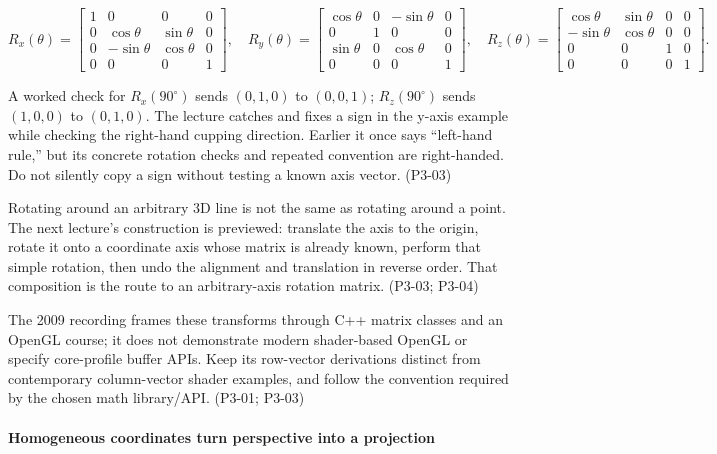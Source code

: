 \[
R_x(\theta)=\begin{bmatrix}1&0&0&0\\0&\cos\theta&\sin\theta&0\\0&-\sin\theta&\cos\theta&0\\0&0&0&1\end{bmatrix},\quad
R_y(\theta)=\begin{bmatrix}\cos\theta&0&-\sin\theta&0\\0&1&0&0\\\sin\theta&0&\cos\theta&0\\0&0&0&1\end{bmatrix},\quad
R_z(\theta)=\begin{bmatrix}\cos\theta&\sin\theta&0&0\\-\sin\theta&\cos\theta&0&0\\0&0&1&0\\0&0&0&1\end{bmatrix}.
\]

A worked check for \(R_x(90^\circ)\) sends \((0,1,0)\) to \((0,0,1)\); \(R_z(90^\circ)\) sends \((1,0,0)\) to \((0,1,0)\). The lecture catches and fixes a sign in the y-axis example while checking the right-hand cupping direction. Earlier it once says ``left-hand rule,'' but its concrete rotation checks and repeated convention are right-handed. Do not silently copy a sign without testing a known axis vector. (P3-03)

Rotating around an arbitrary 3D line is not the same as rotating around a point. The next lecture's construction is previewed: translate the axis to the origin, rotate it onto a coordinate axis whose matrix is already known, perform that simple rotation, then undo the alignment and translation in reverse order. That composition is the route to an arbitrary-axis rotation matrix. (P3-03; P3-04)

The 2009 recording frames these transforms through C++ matrix classes and an OpenGL course; it does not demonstrate modern shader-based OpenGL or specify core-profile buffer APIs. Keep its row-vector derivations distinct from contemporary column-vector shader examples, and follow the convention required by the chosen math library/API. (P3-01; P3-03)

\paragraph{Homogeneous coordinates turn perspective into a projection}\label{homogeneous-coordinates-turn-perspective-into-a-projection}

